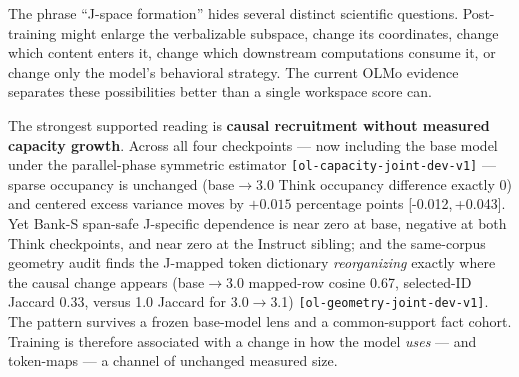 \documentclass[11pt]{article}
\newcommand{\eid}[1]{{\footnotesize\nolinkurl{[#1]}}}
\newcommand{\ci}[2]{{[#1,\,#2]}}
\begin{document}
The phrase ``J-space formation'' hides several distinct scientific questions.
Post-training might enlarge the verbalizable subspace, change its coordinates,
change which content enters it, change which downstream computations consume
it, or change only the model's behavioral strategy. The current OLMo evidence
separates these possibilities better than a single workspace score can.

\begin{takeawaybox}
The strongest supported reading is \textbf{causal recruitment without measured
capacity growth}. Across all four checkpoints --- now including the base model
under the parallel-phase symmetric estimator \eid{ol-capacity-joint-dev-v1}
--- sparse occupancy is unchanged (base$\to$3.0 Think occupancy difference
exactly 0) and centered excess variance moves by $+0.015$ percentage points
\ci{-0.012}{+0.043}. Yet Bank-S span-safe J-specific dependence is near zero
at base, negative at both Think checkpoints, and near zero at the Instruct
sibling; and the same-corpus geometry audit finds the J-mapped token
dictionary \emph{reorganizing} exactly where the causal change appears
(base$\to$3.0 mapped-row cosine 0.67, selected-ID Jaccard 0.33, versus 1.0
Jaccard for 3.0$\to$3.1) \eid{ol-geometry-joint-dev-v1}. The pattern survives
a frozen base-model lens and a common-support fact cohort. Training is
therefore associated with a change in how the model \emph{uses} --- and
token-maps --- a channel of unchanged measured size.
\end{takeawaybox}
\end{document}
